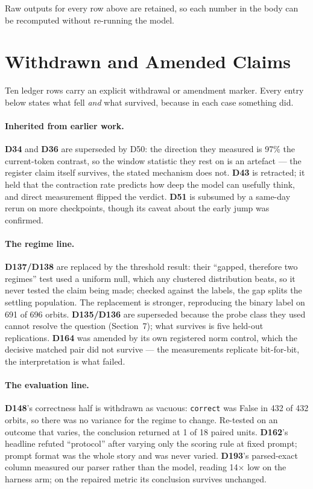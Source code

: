 \documentclass{zapiski}
\begin{document}
Raw outputs for every row above are retained, so each number in the body can be recomputed without
re-running the model.

\section{Withdrawn and Amended Claims}

Ten ledger rows carry an explicit withdrawal or amendment marker. Every entry below states what
fell \emph{and} what survived, because in each case something did.

\paragraph{Inherited from earlier work.} \textbf{D34} and \textbf{D36} are superseded by D50: the
direction they measured is 97\% the current-token contrast, so the window statistic they rest on
is an artefact --- the register claim itself survives, the stated mechanism does not.
\textbf{D43} is retracted; it held that the contraction rate predicts how deep the model can
usefully think, and direct measurement flipped the verdict. \textbf{D51} is subsumed by a
same-day rerun on more checkpoints, though its caveat about the early jump was confirmed.

\paragraph{The regime line.} \textbf{D137/D138} are replaced by the threshold result: their
``gapped, therefore two regimes'' test used a uniform null, which any clustered distribution
beats, so it never tested the claim being made; checked against the labels, the gap splits the
settling population. The replacement is stronger, reproducing the binary label on 691 of 696
orbits. \textbf{D135/D136} are superseded because the probe class they used cannot resolve the
question (Section~7); what survives is five held-out replications. \textbf{D164} was amended by
its own registered norm control, which the decisive matched pair did not survive --- the
measurements replicate bit-for-bit, the interpretation is what failed.

\paragraph{The evaluation line.} \textbf{D148}'s correctness half is withdrawn as vacuous:
\texttt{correct} was False in 432 of 432 orbits, so there was no variance for the regime to
change. Re-tested on an outcome that varies, the conclusion returned at 1 of 18 paired units.
\textbf{D162}'s headline refuted ``protocol'' after varying only the scoring rule at fixed
prompt; prompt format was the whole story and was never varied. \textbf{D193}'s parsed-exact
column measured our parser rather than the model, reading 14$\times$ low on the harness arm; on
the repaired metric its conclusion survives unchanged.
\end{document}
